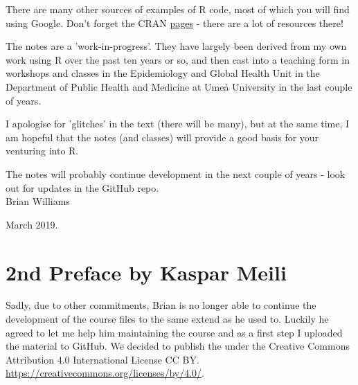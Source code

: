 \documentclass[titlepage]{book}\usepackage{knitr}
\begin{document}
There are many other sources of examples of R code, most of which you will find using Google. Don't forget the CRAN \href{https://cran.r-project.org/}{pages} - there are a lot of resources there! 

The notes are a 'work-in-progress'.  They have largely been derived from my own work using R over the past ten years or so, and then cast into a teaching form in workshops and classes in the Epidemiology and Global Health Unit in the Department of Public Health and Medicine at Umeå University in the last couple of years.

I apologise for 'glitches' in the text (there will be many), but at the same time, I am hopeful that the notes (and classes) will provide a good basis for your venturing into R.

The notes will probably continue development in the next couple of years - look out for updates in the GitHub repo. \\


Brian Williams
 
 
March 2019.


\section{2nd Preface by Kaspar Meili}

Sadly, due to other commitments, Brian is no longer able to continue the development of the course files to the same extend as he used to. Luckily he agreed to let me help him maintaining the course and as a first step I uploaded the material to GitHub. We decided to publish the under the Creative Commons Attribution 4.0 International License CC BY. \url{https://creativecommons.org/licenses/by/4.0/}. 

\cleardoublepage
{}
{}
\tableofcontents
\cleardoublepage
\mainmatter


\begin{knitrout}
\color{fgcolor}\begin{kframe}
\begin{alltt}
\hlstd{(}\hlstd{)}
 \hlkwb{<-} 
 \hlkwb{<-} 
\end{alltt}
\end{kframe}
\end{knitrout}
\end{document}
